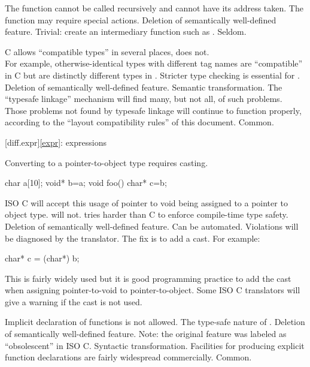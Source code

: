 \change
The  function cannot be called recursively and cannot have its address taken.
\rationale
The  function may require special actions.
\effect
Deletion of semantically well-defined feature.
\difficulty
Trivial: create an intermediary function such as
.
\howwide
Seldom.

\change
C allows ``compatible types'' in several places, \Cpp{} does not.\\
For example,
otherwise-identical  types with different tag names
are ``compatible'' in C but are distinctly different types
in \Cpp{}.
\rationale
Stricter type checking is essential for \Cpp{}.
\effect
Deletion of semantically well-defined feature.
\difficulty
Semantic transformation.
The ``typesafe linkage'' mechanism will find many, but not all,
of such problems.
Those problems not found by typesafe linkage will continue to
function properly,
according to the ``layout compatibility rules'' of this
document.
\howwide
Common.

[diff.expr]{\ref{expr}: expressions}

\change
Converting  to a pointer-to-object type requires casting.

\begin{codeblock}
char a[10];
void* b=a;
void foo() {
  char* c=b;
}
\end{codeblock}

ISO C will accept this usage of pointer to void being assigned
to a pointer to object type.
\Cpp{} will not.
\rationale
\Cpp{} tries harder than C to enforce compile-time type safety.
\effect
Deletion of semantically well-defined feature.
\difficulty
Can be automated.
Violations will be diagnosed by the \Cpp{} translator.
The
fix is to add a  cast.
For example:
\begin{codeblock}
char* c = (char*) b;
\end{codeblock}

\howwide
This is fairly widely used but it is good
programming practice to add the cast when assigning pointer-to-void to pointer-to-object.
Some ISO C translators will give a warning
if the cast is not used.

\change
Implicit declaration of functions is not allowed.
\rationale
The type-safe nature of \Cpp{}.
\effect
Deletion of semantically well-defined feature.
Note: the original feature was labeled as ``obsolescent'' in ISO C.
\difficulty
Syntactic transformation.
Facilities for producing explicit function declarations are fairly
widespread commercially.
\howwide
Common.

